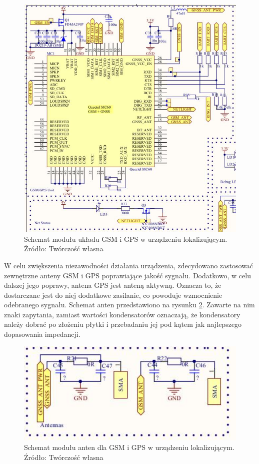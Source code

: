 \begin{figure}[H]
	\centering
	\includegraphics[width=15cm]{img/schematics/mainboard_functional_gps.jpg}
	\caption{Schemat modułu układu GSM i GPS w urządzeniu lokalizującym. \\ Źródło: Twórczość własna}
	\label{fig:image_mainboard_functional_gps_gsm}
\end{figure}

W celu zwiększenia niezawodności działania urządzenia, zdecydowano zastosować zewnętrzne anteny GSM i GPS poprawiające jakość sygnału. Dodatkowo, w celu dalszej jego poprawy, antena GPS jest anteną aktywną. Oznacza to, że dostarczane jest do niej dodatkowe zasilanie, co powoduje wzmocnienie odebranego sygnału. Schemat anten przedstawiono na rysunku \ref{fig:image_mainboard_functional_gps_gsm_antennas}. Zawarte na nim znaki zapytania, zamiast wartości kondensatorów oznaczają, że kondensatory należy dobrać po złożeniu płytki i przebadaniu jej pod kątem jak najlepszego dopasowania impedancji.

\begin{figure}[H]
	\centering
	\includegraphics[width=15cm]{img/schematics/mainboard_functional_gps_gsm_antennas.jpg}
	\caption{Schemat modułu anten dla GSM i GPS w urządzeniu lokalizującym. \\ Źródło: Twórczość własna}
	\label{fig:image_mainboard_functional_gps_gsm_antennas}
\end{figure}

